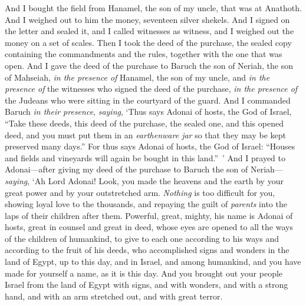 \begin{biblechapter}
\verse And I bought the field from Hanamel, the son of my uncle, that was at Anathoth. And I weighed out to him the money, seventeen silver shekels.
\verse And I signed on the letter and sealed it, and I called witnesses as witness, and I weighed out the money on a set of scales.
\verse Then I took the deed of the purchase, the sealed copy containing the commandments and the rules, together with the one that was open.
\verse And I gave the deed of the purchase to Baruch the son of Neriah, the son of Mahseiah, \textit{in the presence of} Hanamel, the son of my uncle, and \textit{in the presence of} the witnesses who signed the deed of the purchase, \textit{in the presence of} the Judeans who were sitting in the courtyard of the guard.
\verse And I commanded Baruch \textit{in their presence}, \textit{saying},
\verse ‘Thus says Adonai of hosts, the God of Israel, “Take these deeds, this deed of the purchase, the sealed one, and this opened deed, and you must put them in an \textit{earthenware jar} so that they may be kept preserved many days.”
\verse For thus says Adonai of hosts, the God of Israel: “Houses and fields and vineyards will again be bought in this land.” ’
\verse And I prayed to Adonai—after giving my deed of the purchase to Baruch the son of Neriah—\textit{saying},
\verse ‘Ah Lord Adonai! Look, you made the heavens and the earth by your great power and by your outstretched arm. \textit{Nothing} is too difficult for you,
\verse showing loyal love to the thousands, and repaying the guilt of \textit{parents} into the laps of their children after them. Powerful, great, mighty, his name is Adonai of hosts,
\verse great in counsel and great in deed, whose eyes are opened to all the ways of the children of humankind, to give to each one according to his ways and according to the fruit of his deeds,
\verse who accomplished signs and wonders in the land of Egypt, up to this day, and in Israel, and among humankind, and you have made for yourself a name, as it is this day.
\verse And you brought out your people Israel from the land of Egypt with signs, and with wonders, and with a strong hand, and with an arm stretched out, and with great terror.

\end{biblechapter}
